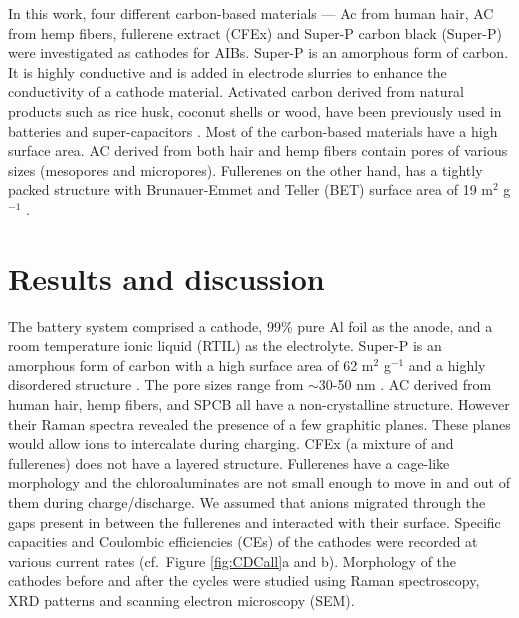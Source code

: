 \documentclass{article}
\begin{document}
In this work, four different carbon-based materials --- Ac from human hair, AC from hemp fibers, fullerene extract (CFEx) and Super-P carbon black (Super-P) were investigated as cathodes for AIBs. Super-P is an amorphous form of carbon. It is highly conductive and is added in electrode slurries to enhance the conductivity of a cathode material. Activated carbon derived from natural products such as rice husk, coconut shells or wood, have been previously used in batteries and super-capacitors \cite{hussain_development_2019, frackowiak_carbon_2001}. Most of the carbon-based materials have a high surface area. AC derived from both hair and hemp fibers contain pores of various sizes (mesopores and micropores). Fullerenes on the other hand, has a tightly packed structure with Brunauer-Emmet and Teller (BET) surface area of 19 m$^2$ g$^{-1}$ \cite{}.

\section{Results and discussion}
The battery system comprised a cathode, 99\% pure Al foil as the anode, and a room temperature ionic liquid (RTIL) as the electrolyte. Super-P is an amorphous form of carbon with a high surface area of 62 m$^2$ g$^{-1}$ and a highly disordered structure \cite{see_reversible_2017}. The pore sizes range from $\sim$30-50 nm \cite{younesi_analysis_2015}. AC derived from human hair, hemp fibers, and SPCB all have a non-crystalline structure. However their Raman spectra revealed the presence of a few graphitic planes. These planes would allow  ions to intercalate during charging. CFEx (a mixture of  and  fullerenes) does not have a layered structure. Fullerenes have a cage-like morphology and the chloroaluminates are not small enough to move in and out of them during charge/discharge. We assumed that  anions migrated through the gaps present in between the fullerenes and interacted with their surface. Specific capacities and Coulombic efficiencies (CEs) of the cathodes were recorded at various current rates (cf.\ Figure \ref{fig:CDCall}a and b). Morphology of the cathodes before and after the cycles were studied using Raman spectroscopy, XRD patterns and scanning electron microscopy (SEM).
\end{document}
